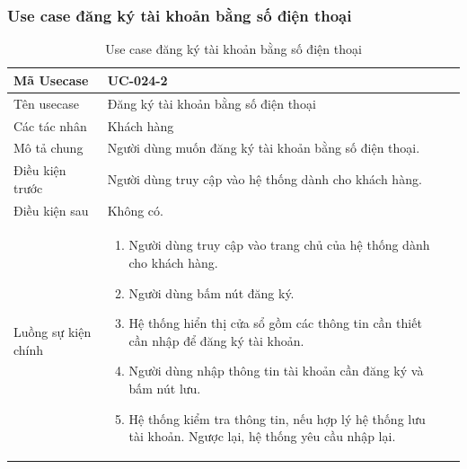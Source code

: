\documentclass[12pt,a4paper]{article}
\begin{document}
    \subsubsection*{Use case đăng ký tài khoản bằng số điện thoại}
    \begin{table}[H]
        \centering
        \begin{tabular}{|p{3.5cm}|p{11.5cm}|c|}
            \hline
            Mã Usecase      & UC-024-2                                              \\
            \hline
            Tên usecase     & Đăng ký tài khoản bằng số điện thoại                  \\
            \hline
            Các tác nhân    & Khách hàng                                            \\
            \hline
            Mô tả chung     & Người dùng muốn đăng ký tài khoản bằng số điện thoại. \\
            \hline

            Điều kiện trước & Người dùng truy cập vào hệ thống dành cho khách hàng. \\
            \hline

            Điều kiện sau   & Không có.                                             \\
            \hline

            Luồng sự kiện chính & \vspace{-.8cm}\begin{enumerate}
                                                    \item Người dùng truy cập vào trang chủ của hệ thống dành cho khách hàng.
                                                    \item Người dùng bấm nút đăng ký.
                                                    \item Hệ thống hiển thị cửa sổ gồm các thông tin cần thiết cần nhập để đăng ký tài khoản.
                                                    \item Người dùng nhập thông tin tài khoản cần đăng ký và bấm nút lưu.
                                                    \item Hệ thống kiểm tra thông tin, nếu hợp lý hệ thống lưu tài khoản. Ngược lại, hệ thống yêu cầu nhập lại.
            \end{enumerate}
            \\
            \hline
        \end{tabular}
        \caption{Use case đăng ký tài khoản bằng số điện thoại}

    \end{table}
\end{document}
